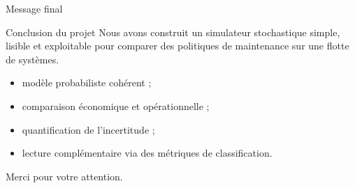 \documentclass[aspectratio=169]{beamer}
\begin{document}
\begin{frame}{Message final}
\begin{block}{Conclusion du projet}
Nous avons construit un simulateur stochastique simple, lisible et exploitable pour comparer des politiques de maintenance sur une flotte de systèmes.
\end{block}

\vspace{0.25cm}
\begin{itemize}
  \item modèle probabiliste cohérent ;
  \item comparaison économique et opérationnelle ;
  \item quantification de l'incertitude ;
  \item lecture complémentaire via des métriques de classification.
\end{itemize}

\vspace{0.25cm}
\centering
\Large Merci pour votre attention.
\end{frame}
\end{document}

